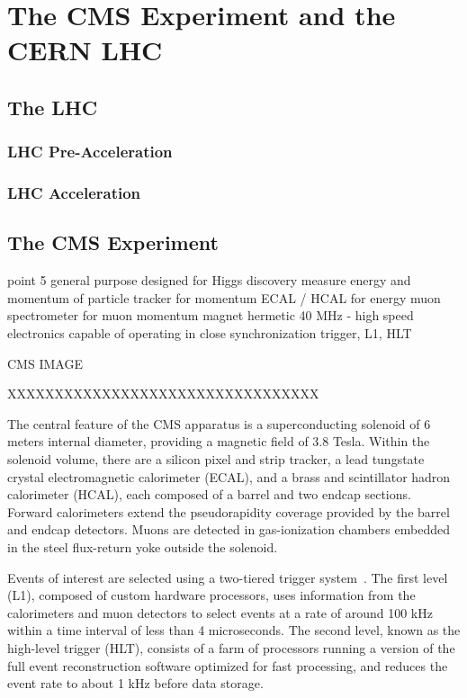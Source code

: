 \chapter{The CMS Experiment and the CERN LHC}

\section{The LHC}

\subsection{LHC Pre-Acceleration}

\subsection{LHC Acceleration}

\section{The CMS Experiment}

point 5
general purpose
    designed for Higgs discovery
    measure energy and momentum of particle
    tracker for momentum
    ECAL / HCAL for energy
    muon spectrometer for muon momentum
    magnet
    hermetic
40 MHz - high speed electronics capable of operating in close synchronization
trigger, L1, HLT

CMS IMAGE

XXXXXXXXXXXXXXXXXXXXXXXXXXXXXXXXX

The central feature of the CMS apparatus is a superconducting solenoid of 6 meters internal diameter, providing a magnetic field of 3.8 Tesla. Within the solenoid volume, there are a silicon pixel and strip tracker, a lead tungstate crystal electromagnetic calorimeter (ECAL), and a brass and scintillator hadron calorimeter (HCAL), each composed of a barrel and two endcap sections. Forward calorimeters extend the pseudorapidity coverage provided by the barrel and endcap detectors. Muons are detected in gas-ionization chambers embedded in the steel flux-return yoke outside the solenoid.

Events of interest are selected using a two-tiered trigger system~\cite{Khachatryan:2016bia}. The first level (L1), composed of custom hardware processors, uses information from the calorimeters and muon detectors to select events at a rate of around 100 kHz within a time interval of less than 4 microseconds. The second level, known as the high-level trigger (HLT), consists of a farm of processors running a version of the full event reconstruction software optimized for fast processing, and reduces the event rate to about 1 kHz before data storage.

